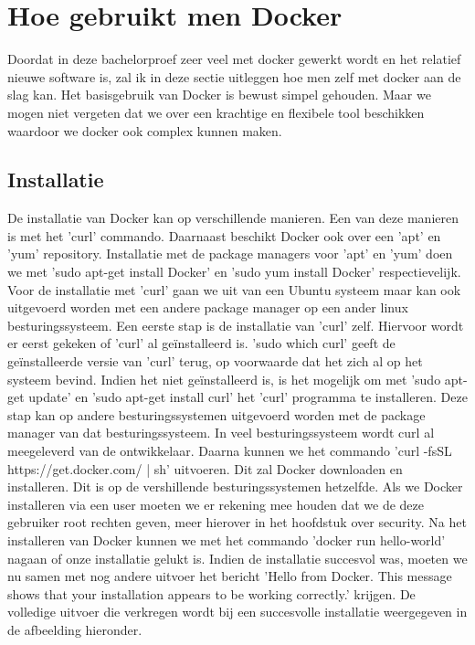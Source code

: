 \section{Hoe gebruikt men Docker}

Doordat in deze bachelorproef zeer veel met docker gewerkt wordt en het relatief nieuwe software is, zal ik in deze sectie uitleggen hoe men zelf met docker aan de slag kan. Het basisgebruik van Docker is bewust simpel gehouden. Maar we mogen niet vergeten dat we over een krachtige en flexibele tool beschikken waardoor we docker ook complex kunnen maken.

\subsection{Installatie}

De installatie van Docker kan op verschillende manieren. Een van deze manieren is met het 'curl' commando. Daarnaast beschikt Docker ook over een 'apt' en 'yum' repository. Installatie met de package managers voor 'apt' en 'yum' doen we met 'sudo apt-get install Docker' en 'sudo yum install Docker' respectievelijk. Voor de installatie met 'curl' gaan we uit van een Ubuntu systeem maar kan ook uitgevoerd worden met een andere package manager op een ander linux besturingssysteem. Een eerste stap is de installatie van 'curl' zelf. Hiervoor wordt er eerst gekeken of 'curl' al geïnstalleerd is. 'sudo which curl' geeft de geïnstalleerde versie van 'curl' terug, op voorwaarde dat het zich al op het systeem bevind. Indien het niet geïnstalleerd is, is het mogelijk om met 'sudo apt-get update' en 'sudo apt-get install curl' het 'curl' programma te installeren. Deze stap kan op andere besturingssystemen uitgevoerd worden met de package manager van dat besturingssysteem. In veel besturingssysteem wordt curl al meegeleverd van de ontwikkelaar. Daarna kunnen we het commando 'curl -fsSL https://get.docker.com/ | sh' uitvoeren. Dit zal Docker downloaden en installeren. Dit is op de vershillende besturingssystemen hetzelfde. Als we Docker installeren via een user moeten we er rekening mee houden dat we de deze gebruiker root rechten geven, meer hierover in het hoofdstuk over security. Na het installeren van Docker kunnen we met het commando 'docker run hello-world' nagaan of onze installatie gelukt is. Indien de installatie succesvol was, moeten we nu samen met nog andere uitvoer het bericht 'Hello from Docker. This message shows that your installation appears to be working correctly.' krijgen. De volledige uitvoer die verkregen wordt bij een succesvolle installatie weergegeven in de afbeelding hieronder.

